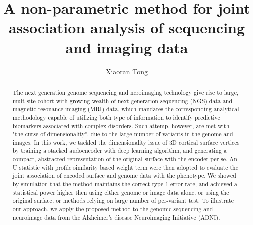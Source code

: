 \documentclass[12pt]{article}
\author{Xiaoran Tong}
\begin{document}
\title{A non-parametric method for joint association analysis of
  sequencing and imaging data}
\maketitle

\begin{abstract}
  The next generation genome sequencing and neroimaging technology
  give rise to large, mult-site cohort with growing wealth of next
  generation sequencing (NGS) data and magnetic resonance imaging
  (MRI) data, which mandates the corresponding analytical methodology
  capable of utilizing both type of information to identify predictive
  biomarkers associated with complex disorders. Such attemp, however,
  are met with "the curse of dimensionality", due to the large number
  of variants in the genome and images. In this work, we tackled the
  dimensionality issue of 3D cortical surface vertices by training a
  stacked audoencoder with deep learning algorithm, and generating a
  compact, abstracted representation of the original surface with the
  encoder per se. An U statistic with profile similarity based weight
  term were then adopted to evaluate the joint association of encoded
  surface and genome data with the phenotype. We showed by simulation
  that the method maintains the correct type 1 error rate, and
  achieved a statistical power higher then using either genome or
  image data alone, or using the original surface, or methods relying
  on large number of per-variant test. To illustrate our approach, we
  apply the proposed method to the genomic sequencing and neuroimage
  data from the Alzheimer's disease Neuroimaging Initiative (ADNI).
\end{abstract}


%

%
%

\printbibheading
\printbibliography
\end{document}
